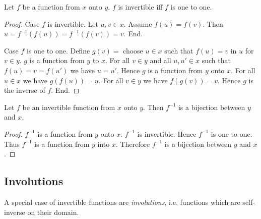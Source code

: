 \documentclass[../../set-theory.ftl.tex]{subfiles}
\begin{document}
\begin{forthel}
    \begin{proposition}\label{SetTheory_02_03_394829}
      Let $f$ be a function from $x$ onto $y$.
      $f$ is invertible iff $f$ is one to one.
    \end{proposition}
    \begin{proof}
      Case $f$ is invertible.
        Let $u,v \in x$.
        Assume $f(u) = f(v)$.
        Then $u = f^{-1}(f(u)) = f^{-1}(f(v)) = v$.
      End.

      Case $f$ is one to one.
        Define $g(v) = $ choose $u \in x$ such that $f(u) = v$ in $u$ for $v \in y$.
        $g$ is a function from $y$ to $x$.
        For all $v \in y$ and all $u,u' \in x$ such that $f(u) = v = f(u')$ we have $u = u'$.
        Hence $g$ is a function from $y$ onto $x$.
        For all $u \in x$ we have $g(f(u)) = u$.
        For all $v \in y$ we have $f(g(v)) = v$.
        Hence $g$ is the inverse of $f$.
      End.
    \end{proof}

    \begin{corollary}\label{SetTheory_02_03_187673}
      Let $f$ be an invertible function from $x$ onto $y$.
      Then $f^{-1}$ is a bijection between $y$ and $x$.
    \end{corollary}
    \begin{proof}
      $f^{-1}$ is a function from $y$ onto $x$.
      $f^{-1}$ is invertible.
      Hence $f^{-1}$ is one to one.
      Thus $f^{-1}$ is a function from $y$ into $x$.
      Therefore $f^{-1}$ is a bijection between $y$ and $x$.
    \end{proof}
  \end{forthel}


  \subsection{Involutions}

  A special case of invertible functions are \textit{involutions}, i.e.
  functions which are self-inverse on their domain.
\end{document}
